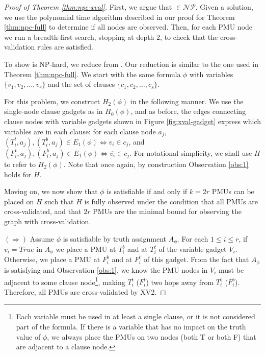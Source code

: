 \begin{proof}[Proof of Theorem \ref{thm:npc-xval}]
First, we argue that \xval $\in \mathcal{NP}$.  Given a \xval solution, we use
the polynomial time algorithm described in our proof for Theorem
\ref{thm:npc-full} to determine if all nodes are observed.  Then, for each
PMU node we run a breadth-first search, stopping at depth $2$, to check that
the cross-validation rules are satisfied.

To show \xval is NP-hard, we reduce from \sats.  Our reduction is similar to
the one used in Theorem \ref{thm:npc-full}.  We start with the same \sat formula $\phi$ with variables $\{v_1,v_2, \dots , v_r\}$ and the set of clauses $\{c_1,c_2,\dots , c_s \}$.

For this problem, we construct $H_2(\phi)$ in the following manner. We use the single-node clause gadgets  as in $H_0(\phi)$, and as before, the edges connecting clause nodes with variable gadgets shown in Figure \ref{fig:xval-gadget} express which variables are in each clause: for each clause node $a_j$, $(T^t_i, a_j),(T^b_i, a_j)\in E_1(\phi) \Leftrightarrow v_i\in c_j$, and $(F^t_i, a_j),(F^b_i, a_j)\in E_1(\phi) \Leftrightarrow \overline{v_i}\in c_j$. For notational simplicity, we shall use $H$ to refer to $H_2(\phi)$. Note that once again, by construction Observation \ref{obs:1} holds for $H$.

Moving on, we now show that $\phi$ is satisfiable if and only if
$k=2r$ PMUs can be placed on $H$ such that $H$ is fully observed under the
condition that all PMUs are cross-validated, and that $2r$ PMUs are the minimal
bound for observing the graph with cross-validation.

$(\Rightarrow)$ Assume $\phi$ is satisfiable by truth assignment $A_{\phi}$.
For each $1\leq i\leq r$, if $v_i=True$ in $A_{\phi}$ we place a PMU at $T_i^b$
and at $T_i^t$ of the variable gadget $V_i$. Otherwise, we place a PMU at $F_i^b$
and at $F_i^t$ of this gadget. From the fact that $A_{\phi}$ is satisfying and Observation \ref{obs:1}, we know the PMU nodes in $V_i$ must be
adjacent to some clause node\footnote{Each variable must be used in at least a single clause, or it is not considered part of the formula. If there is a variable that has no impact on the truth value of $\phi$, we always place the PMUs on two nodes (both T or both F) that are adjacent to a clause node.}, making $T_i^t$ ($F_i^t$) two hops away from
$T_i^b$ ($F_i^b$). Therefore, all PMUs are cross-validated by XV2.


\end{proof}
